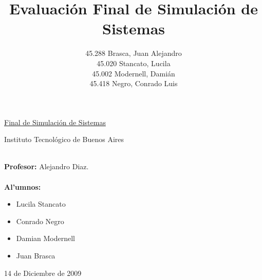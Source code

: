 \documentclass{article}
\title{Evaluaci\'on Final de Simulaci\'on de Sistemas}
\author{45.288 Brasca, Juan Alejandro\\45.020 Stancato, Lucila\\45.002 Modernell, Dami\'an\\45.418 Negro, Conrado Luis}
\numberwithin{equation}{section}
\numberwithin{figure}{section}
\numberwithin{table}{section}
\begin{document}
\Large

%
%
\pagestyle{fancy}
\renewcommand{\sectionmark}[1]{\markboth{}{\thesection\ \ #1}}
\renewcommand{\footrulewidth}{0.6pt} %

\chead{}
\lfoot{}
\cfoot{\thepage}
\rfoot{}

%
%
\begin{titlepage}

%
%
%
	
	\begin{figure}
\begin{center}
	\end{center}
\end{figure}

\vspace{3cm}
%
	\begin{center}
		\underline{\Huge{Final de Simulaci\'on de Sistemas}}\\
\vspace{1cm}
	    \huge{Instituto Tecnol\'ogico de Buenos Aires
		\vspace{1cm}
		
}	\end{center}
	\vspace{1.5cm}
%
%


\noindent \huge{{\bf}
\\
\Large{{\bf Profesor:}} Alejandro Diaz. \\
\\
  \Large{{\bf Al'umnos:}}
\begin{itemize}
 \item Lucila Stancato \\
\item Conrado Negro \\
\item Damian Modernell \\
\item Juan Brasca 

\end{itemize}
 

	\vfill
  \begin{center}
		\huge{14 de Diciembre de 2009}
	\end{center}
}
\end{titlepage}
\end{document}
